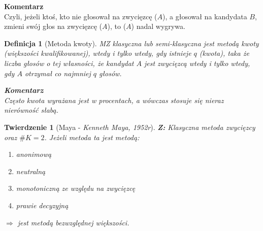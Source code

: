 \documentclass[12pt,a4paper]{article}
\theoremstyle{break}
\newcommand{\Komentarz}[1]{
	\begin{mdframed}[style=zadanie]
		\textbf{Komentarz}\\
		#1
	\end{mdframed}
	}
\newtheorem{definition}{Definicja}[section]
\newtheorem{theorem}{Twierdzenie}[section]
\begin{document}
	\Komentarz{Czyli, jeżeli ktoś, kto nie głosował na zwycięzcę ($A$), a głosował na kandydata $B$, zmieni swój głos na zwycięzcę ($A$), to ($A$) nadal wygrywa.}
	
	\begin{definition}[Metoda kwoty]
		MZ klasyczna lub semi-klasyczna jest metodą kwoty (większości kwalifikowanej), \textit{wtedy i tylko wtedy}, gdy istnieje $q$ (kwota), taka że liczba głosów o tej własności, że kandydat $A$ jest zwycięzcą \textit{wtedy i tylko wtedy}, gdy $A$ otrzymał co najmniej $q$ głosów.
		
		\Komentarz{Często kwota wyrażana jest w procentach, a wówczas stosuje się nieraz nierówność słabą.}
	\end{definition}

	\newpage
	\begin{theorem}[Maya - \textit{Kenneth Maya, 1952r}]
		\textbf{Z:} Klasyczna metoda zwycięzcy oraz $\# K = 2$. Jeżeli metoda ta jest metodą:
		\begin{enumerate}[(1)]
			\item anonimową
			\item neutralną
			\item monotoniczną ze względu na zwycięzcę
			\item prawie decyzyjną
		\end{enumerate}
		$\Rightarrow$ jest metodą bezwzględnej większości.
	\end{theorem}
	
\end{document}
